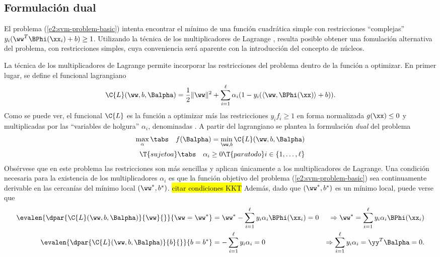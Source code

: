 %
%
\subsection{Formulación dual}
%
El problema (\ref{e2:svm-problem-basic}) intenta encontrar el mínimo
de una función cuadrática simple con restricciones ``complejas''
${y}_i(\ww^T\BPhi(\xx_i)+b)\geq{}1$.  Utilizando la técnica de los
multiplicadores de Lagrange \cite{bottou,kkt}, resulta posible obtener
una fomulación alternativa del problema, con restricciones simples,
cuya conveniencia será aparente con la introducción del concepto de
núcleos.

La técnica de los multiplicadores de Lagrange permite incorporar las
restricciones del problema dentro de la función a optimizar.  En
primer lugar, se define el funcional lagrangiano
%
\begin{align}\label{e2:lagrangian}
  \C{L}(\ww,b,\Balpha) = \frac{1}{2} \|\ww\|^2 + \sum_{i=1}^{\ell}
  \alpha_i (1-y_i(\langle\ww,\BPhi(\xx)\rangle+b)).
\end{align}
%
Como se puede ver, el funcional $\C{L}$ es la función a optimizar más
las restricciones ${y}_if_i\geq{}1$ en forma normalizada $g(\xx)\leq0$
y multiplicadas por las ``variables de holgura'' $\alpha_i$,
denominadas . A partir del lagrangiano
se plantea la formulación \emph{dual} del problema
%
\begin{align}\label{e2:svm-problem-dual}
  \begin{split}
    \max_\alpha \tabs\quad f(\Balpha) = \min_{\ww,b} \C{L}(\ww,b,\Balpha)\\
    \T{sujeto a} \tabs\quad \alpha_i \geq 0\T{ para todo } i\in\{1,\ldots,\ell\}
  \end{split}
\end{align}
%
Obsérvese que en este problema las restricciones son más sencillas y
aplican únicamente a los multiplicadores de Lagrange. Una condición
necesaria para la existencia de los multiplicadores $\alpha_i$ es que
la función objetivo del problema (\ref{e2:svm-problem-basic}) sea
continuamente derivable en las cercanías del mínimo local $(\ww^*,b^*)$.
\hl{citar condiciones KKT}
Además, dado que $(\ww^*,b^*)$ es un mínimo local, puede verse que
%
\begin{align}\label{e2:lagrangian-w}
  \evalen{\dpar{\C{L}(\ww,b,\Balpha)}{\ww}{}}{\ww=\ww^*}
    &=\ww^*-\sum_{i=1}^\ell y_i\alpha_i\BPhi(\xx_i) = 0
    &\Rightarrow \ww^* = \sum_{i=1}^\ell y_i\alpha_i\BPhi(\xx_i)
  \\
  \label{e2:lagrangian-sum-yalpha}
  \evalen{\dpar{\C{L}(\ww,b,\Balpha)}{b}{}}{b=b^*}
    &=-\sum_{i=1}^\ell y_i\alpha_i = 0
      &\Rightarrow \sum_{i=1}^\ell y_i\alpha_i = \yy^T\Balpha = 0.
\end{align}

